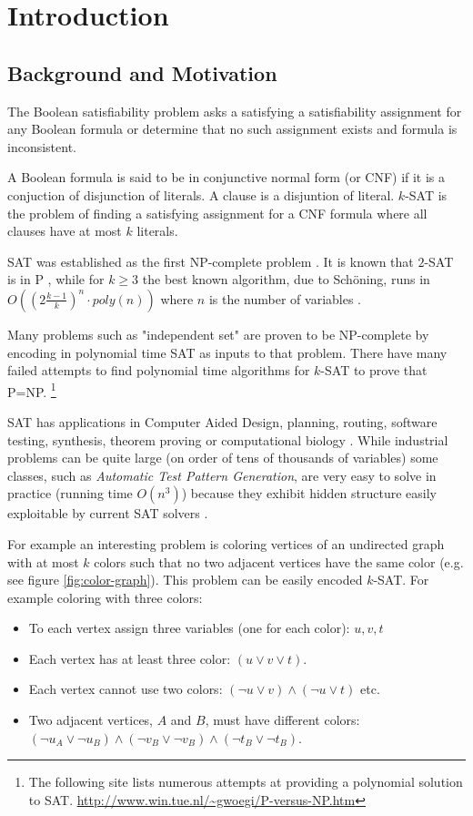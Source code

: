 \chapter{Introduction}

\section{Background and Motivation}

The Boolean satisfiability problem asks a satisfying a
satisfiability assignment for any Boolean formula or determine
that no such assignment exists and formula is inconsistent.

A Boolean formula is said to be in conjunctive normal form (or CNF)
if it is a conjuction of disjunction of literals. A clause
is a disjuntion of literal. $k$-SAT is the problem
of finding a satisfying assignment for a CNF formula where all
clauses have at most $k$ literals.

SAT was established as the first NP-complete problem
\cite{Cook:1971:CTP:800157.805047}. It is known that
$2$-SAT is in P \cite{karp}, while for $k \ge 3$ the best
known algorithm, due to Sch\"{o}ning, runs in $O((2\frac{k -
1}{k})^n \cdot poly(n))$ where $n$ is the number of variables
\cite{Schoning:1999:PAK:795665.796524}.
 
Many problems such as "independent set" are proven to be NP-complete
by encoding in polynomial time SAT as inputs to that problem. There
have many failed attempts to find polynomial time algorithms
for $k$-SAT to prove that P=NP.  \footnote{The following site
lists numerous attempts at providing a polynomial solution to
SAT. \url{http://www.win.tue.nl/~gwoegi/P-versus-NP.htm}}

SAT has applications in Computer Aided Design, planning, routing,
software testing, synthesis, theorem proving or computational
biology \cite{Smith_diagnosis, Soeken:2010:VUM:1870926.1871248,
demoura2008z3, Corblin07asat-based}. While industrial problems
can be quite large (on order of tens of thousands of variables)
some classes, such as \emph{Automatic Test Pattern Generation},
are very easy to solve in practice (running time $O(n^3)$) because
they exhibit hidden structure easily exploitable by current SAT
solvers \cite{Prasad:1999:WAE:309847.309857}.

For example an interesting problem is coloring vertices
of an undirected graph with at most $k$ colors such that no
two adjacent vertices have the same color (e.g. see figure
\ref{fig:color-graph}). This problem can be easily encoded
$k$-SAT. For example coloring with three colors:
\begin{itemize}
  \item To each vertex assign three variables (one for each color): $u, v, t$
  \item Each vertex has at least three color: $(u \lor v \lor t)$.
  \item Each vertex cannot use two colors:
  $(\neg u \lor v) \land (\neg u \lor t)$ etc.
  \item Two adjacent vertices, $A$ and $B$, must have different colors:
  $(\neg u_A \lor \neg u_B) \land (\neg v_B \lor \neg v_B) \land (\neg t_B \lor \neg t_B)$.
\end{itemize}

